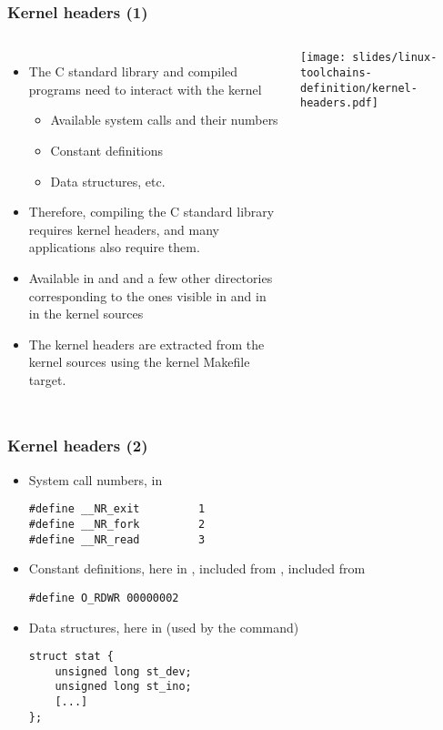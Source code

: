 \begin{frame}
  \frametitle{Kernel headers (1)}
  \begin{columns}
    \begin{itemize}
    \item The C standard library and compiled programs need to interact with the kernel
      \begin{itemize}
      \item Available system calls and their numbers
      \item Constant definitions
      \item Data structures, etc.
      \end{itemize}
    \item Therefore, compiling the C standard library requires kernel headers, and many
          applications also require them.
    \item Available in  and  and a few
          other directories corresponding to the ones visible in
           and in  in the kernel sources
    \item The kernel headers are extracted from the kernel sources using
          the  kernel Makefile target.
    \end{itemize}
    \texttt{[image: slides/linux-toolchains-definition/kernel-headers.pdf]}
  \end{columns}
\end{frame}

\begin{frame}[fragile]
  \frametitle{Kernel headers (2)}
  \begin{itemize}
  \item System call numbers, in 
\begin{verbatim}
#define __NR_exit         1
#define __NR_fork         2
#define __NR_read         3
\end{verbatim}
  \item Constant definitions, here in ,
        included from , included from 
\begin{verbatim}
#define O_RDWR 00000002
\end{verbatim}
  \item Data structures, here in  (used by the  command)
\begin{verbatim}
struct stat {
    unsigned long st_dev;
    unsigned long st_ino;
    [...]
};
\end{verbatim}
  \end{itemize}
\end{frame}

